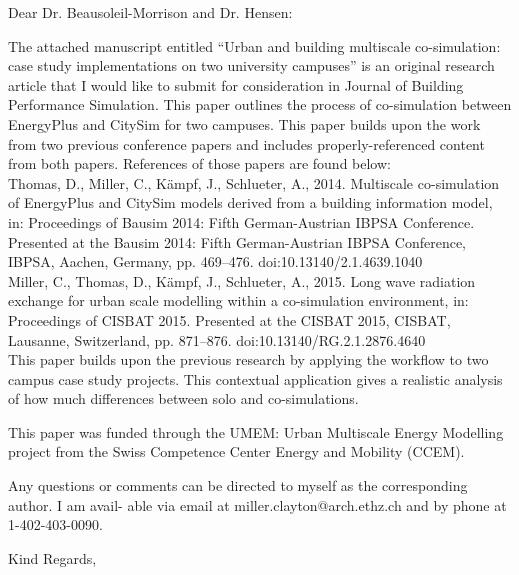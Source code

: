 \documentclass[english]{ethbrief3}
\begin{document}
\opening{Dear Dr. Beausoleil-Morrison and Dr. Hensen:}

The attached manuscript entitled “Urban and building multiscale co-simulation: case study implementations on two university campuses” is an original research article that I would like to submit for consideration in Journal of Building Performance Simulation. This paper outlines the process of co-simulation between EnergyPlus and CitySim for two campuses. This paper builds upon the work from two previous conference papers and includes properly-referenced content from both papers. References of those papers are found below: \\[12pt]
Thomas, D., Miller, C., Kämpf, J., Schlueter, A., 2014. Multiscale co-simulation of EnergyPlus and CitySim models derived from a building information model, in: Proceedings of Bausim 2014: Fifth German-Austrian IBPSA Conference. Presented at the Bausim 2014: Fifth German-Austrian IBPSA Conference, IBPSA, Aachen, Germany, pp. 469–476. doi:10.13140/2.1.4639.1040\\[12pt]

Miller, C., Thomas, D., Kämpf, J., Schlueter, A., 2015. Long wave radiation exchange for urban scale modelling within a co-simulation environment, in: Proceedings of CISBAT 2015. Presented at the CISBAT 2015, CISBAT, Lausanne, Switzerland, pp. 871–876. doi:10.13140/RG.2.1.2876.4640\\[12pt]
This paper builds upon the previous research by applying the workflow to two campus case study projects. This contextual application gives a realistic analysis of how much differences between solo and co-simulations.

This paper was funded through the UMEM: Urban Multiscale Energy Modelling project from the Swiss Competence Center Energy and Mobility (CCEM).

Any questions or comments can be directed to myself as the corresponding author. I am avail-
able via email at miller.clayton@arch.ethz.ch and by phone at 1-402-403-0090.

\closing{Kind Regards,}


\end{document}
